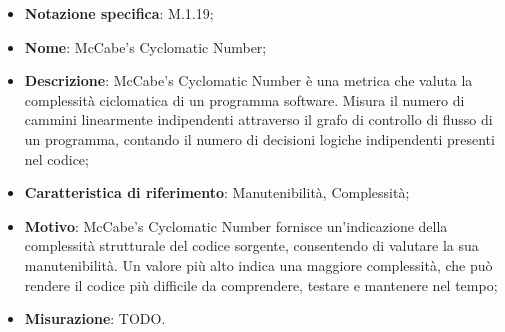 \begin{itemize}
    \item \textbf{Notazione specifica}: M.1.19;
    \item \textbf{Nome}: McCabe’s Cyclomatic Number;
    \item \textbf{Descrizione}: McCabe’s Cyclomatic Number è una metrica che valuta la complessità ciclomatica di un programma software. Misura il numero di cammini linearmente indipendenti attraverso il grafo di controllo di flusso di un programma, contando il numero di decisioni logiche indipendenti presenti nel codice;
    \item \textbf{Caratteristica di riferimento}: Manutenibilità, Complessità;
    \item \textbf{Motivo}: McCabe’s Cyclomatic Number fornisce un'indicazione della complessità strutturale del codice sorgente, consentendo di valutare la sua manutenibilità. Un valore più alto indica una maggiore complessità, che può rendere il codice più difficile da comprendere, testare e mantenere nel tempo;
    \item \textbf{Misurazione}: TODO.
\end{itemize}
